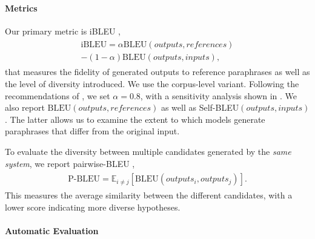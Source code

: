 \documentclass[11pt]{article}
\begin{document}
\paragraph{Metrics}

Our primary metric is iBLEU \cite{ibleu},
\begin{align}
\begin{split}
    \textrm{iBLEU} = \alpha \textrm{BLEU}(outputs, references) \\- (1-\alpha) \textrm{BLEU}(outputs, inputs),
\end{split}
\end{align}
that measures the fidelity of generated outputs to reference paraphrases as well as the level of diversity introduced. We use the corpus-level variant. Following the recommendations of \citet{ibleu}, we set $\alpha = 0.8$, with a sensitivity analysis shown in .  We also report $\textrm{BLEU}(outputs, references)$ as well as
\mbox{Self-{BLEU}}$(outputs, inputs)$. The latter allows us to examine the extent to which models generate paraphrases that differ from the original input.

To evaluate the diversity between multiple candidates generated by the \textit{same system}, we report pairwise-BLEU \cite{cao-wan-2020-divgan},
\begin{align*}
\begin{split}
    \textrm{P-BLEU} = \mathbb{E}_{i \neq j} [ \textrm{BLEU}(outputs_i, outputs_j) ].
\end{split}
\end{align*}
This measures the average similarity between the different candidates, with a lower score indicating more diverse hypotheses.

\paragraph{Automatic Evaluation}
\end{document}

